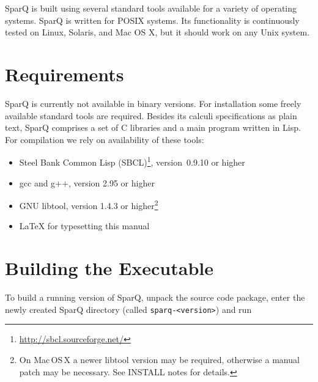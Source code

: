 \documentclass[headsepline]{scrreprt}
\theoremstyle{definition}
\newcommand{\engine}{SparQ}
\begin{document}
\engine{} is built using several standard tools available for a variety of operating systems. \engine{} is written for POSIX systems. Its functionality
is continuously tested on Linux, Solaris, and Mac OS X, but it should work on
any Unix system.


\section{Requirements}\label{sec:requirements}

\engine{} is currently not available in binary versions. For installation some freely available standard tools are required. Besides its calculi specifications as plain text, \engine{} comprises a set of C libraries and a main program written in Lisp. For compilation we rely on availability of these tools:

\begin{itemize}
	\item Steel Bank Common Lisp
          (SBCL)\footnote{\url{http://sbcl.sourceforge.net/}}, version~0.9.10 or higher
	\item gcc and g++, version 2.95 or higher
    \item GNU libtool, version 1.4.3 or higher\footnote{On Mac\,OS\,X a
            newer libtool version may be required, otherwise a manual patch may be
            necessary. See INSTALL notes for details.}
	\item \LaTeX{} for typesetting this manual
\end{itemize}


\section{Building the Executable}
To build a running version of \engine{}, unpack the source code package, enter
the newly created SparQ directory (called \verb|sparq-<version>|) and run
\label{sec:building-binaries}
\end{document}
